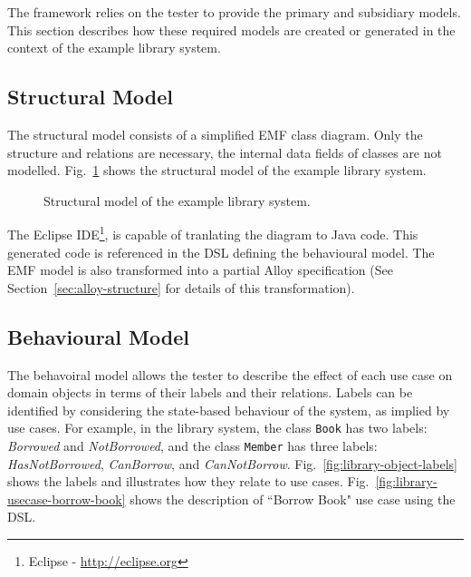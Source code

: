 %
%
\label{sec:create-test-model}
The framework relies on the tester to provide the primary and subsidiary models. This section describes how these required models are created or generated in the context of the example library system. %

\subsection{Structural Model}
\label{sec:create-test model-structure}
The structural model consists of a simplified EMF class diagram. Only the structure and relations are necessary, the internal data fields of classes are not modelled. Fig.~\ref{fig:library-structure-model} shows the structural model of the example library system.

\begin{figure}[h]
\centering
{}
\hfil
{}
\caption{Structural model of the example library system.}
\label{fig:library-structure-model}
\end{figure} 

The Eclipse IDE\footnote{Eclipse - \url{http://eclipse.org}}, is capable of tranlating the diagram to Java code. This generated code is referenced in the DSL defining the behavioural model. The EMF model is also transformed into a partial Alloy specification (See  Section~\ref{sec:alloy-structure} for details of this transformation).

\subsection{Behavioural Model}
\label{sec:create-test model-behaviour}

The behavoiral model allows the tester to describe the effect of each use case on domain objects in terms of their labels and their relations. Labels can be identified by considering the state-based behaviour of the system, as implied by use cases. For example, in the library system, the class \texttt{Book} has two labels: \textit{Borrowed} and \textit{NotBorrowed}, and the class \texttt{Member} has three labels: \textit{HasNotBorrowed}, \textit{CanBorrow}, and \textit{CanNotBorrow}. Fig.~\ref{fig:library-object-labels} shows the labels and illustrates how they relate to use cases. Fig.~\ref{fig:library-usecase-borrow-book} shows the description of ``Borrow Book" use case using the DSL. 

